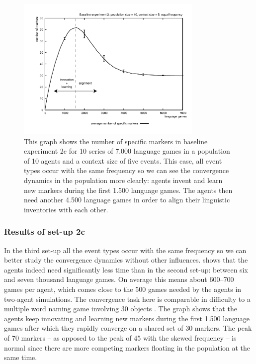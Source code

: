 \begin{figure}[p]
\centerline{\includegraphics[width=0.8\textwidth]{Chapter3/figs/graph-base2-size2}}
  \caption[Baseline experiment 2c: number of markers (equal frequency)]{This graph shows the number of specific markers in baseline experiment 2c for 10 series of 7.000 language games in a population of 10 agents and a context size of five events. This case, all event types occur with the same frequency so we can see the convergence dynamics in the population more clearly: agents invent and learn new markers during the first 1.500 language games. The agents then need another 4.500 language games in order to align their linguistic inventories with each other.}
   \label{f:base2-size2}
\end{figure}


\subsubsection{Results of set-up 2c}
 In the third set-up all the event types occur with the same frequency so we can better study the convergence dynamics without other influences.  shows that the agents indeed need significantly less time than in the second set-up: between six and seven thousand language games. On average this means about 600--700 games per agent, which comes close to the 500 games needed by the agents in two-agent simulations. The convergence task here is comparable in difficulty to a multiple word naming game involving 30 objects \citep[see][]{vanlooveren05design}. The graph shows that the agents keep innovating and learning new markers during the first 1.500 language games after which they rapidly converge on a shared set of 30 markers. The peak of 70 markers -- as opposed to the peak of 45 with the skewed frequency -- is normal since there are more competing markers floating in the population at the same time.




